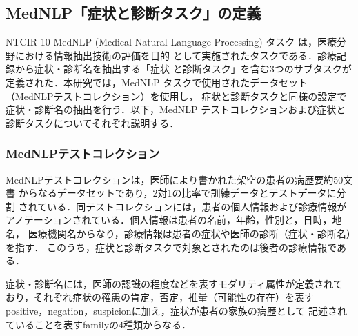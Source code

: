 \documentclass[japanese]{jnlp_1.4}
\begin{document}
\subsection{MedNLP「症状と診断タスク」の定義}
\label{sec:mednlp_taskdef}

NTCIR-10 MedNLP (Medical Natural Language Processing) タスク
\cite{morita2013overview}は，医療分野における情報抽出技術の評価を目的
として実施されたタスクである．診療記録から症状・診断名を抽出する「症状
と診断タスク」を含む3つのサブタスクが定義された．本研究では，MedNLP
タスクで使用されたデータセット（MedNLPテストコレクション）を使用し，
症状と診断タスクと同様の設定で症状・診断名の抽出を行う．以下，MedNLP
テストコレクションおよび症状と診断タスクについてそれぞれ説明する．


\subsubsection*{MedNLPテストコレクション}

MedNLPテストコレクションは，医師により書かれた架空の患者の病歴要約50文書
からなるデータセットであり，2対1の比率で訓練データとテストデータに分割
されている．同テストコレクションには，患者の個人情報および診療情報が
アノテーションされている．個人情報は患者の名前，年齢，性別と，日時，地名，
医療機関名からなり，診療情報は患者の症状や医師の診断（症状・診断名）を指す．
このうち，症状と診断タスクで対象とされたのは後者の診療情報である．

症状・診断名には，医師の認識の程度などを表すモダリティ属性が定義されて
おり，それぞれ症状の罹患の肯定，否定，推量（可能性の存在）を表す
positive，negation，suspicionに加え，症状が患者の家族の病歴として
記述されていることを表すfamilyの4種類からなる．
\end{document}
